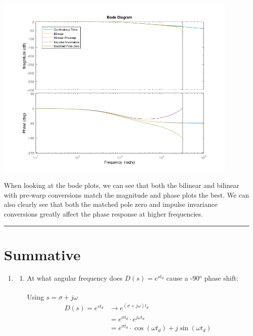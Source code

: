 \documentclass[a4paper,11pt]{article}
\begin{document}
\begin{preview}
\begin{enumerate}
\begin{center}
  \includegraphics[width=0.9\textwidth]{A_1/3_bode.png}
\end{center}

When looking at the bode plots, we can see that both the bilinear and bilinear with pre-warp conversions match the magnitude and phase plots the best. We can also clearly see that both the matched pole zero and impulse invariance conversions greatly affect the phase response at higher frequencies. \\

\hrule
\end{enumerate}

\section*{Summative}

\begin{enumerate}

  \item

  \begin{enumerate}

  \item At what angular frequency does $D(s) = e^{st_d}$ cause a -90$^o$ phase shift:\\\\

  Using $s = \sigma + j\omega$
  \begin{align*}
    D(s) = e^{st_d} &\rightarrow e^{(\sigma + j\omega)t_d}\\
    &= e^{\sigma t_d} \cdot e^{j\omega t_d}\\
    &= e^{\sigma t_d} \cdot \cos(\omega t_d) + j \sin(\omega t_d)\\ 
  \end{align*}


\end{enumerate}
\end{enumerate}
\end{preview}
\end{document}
